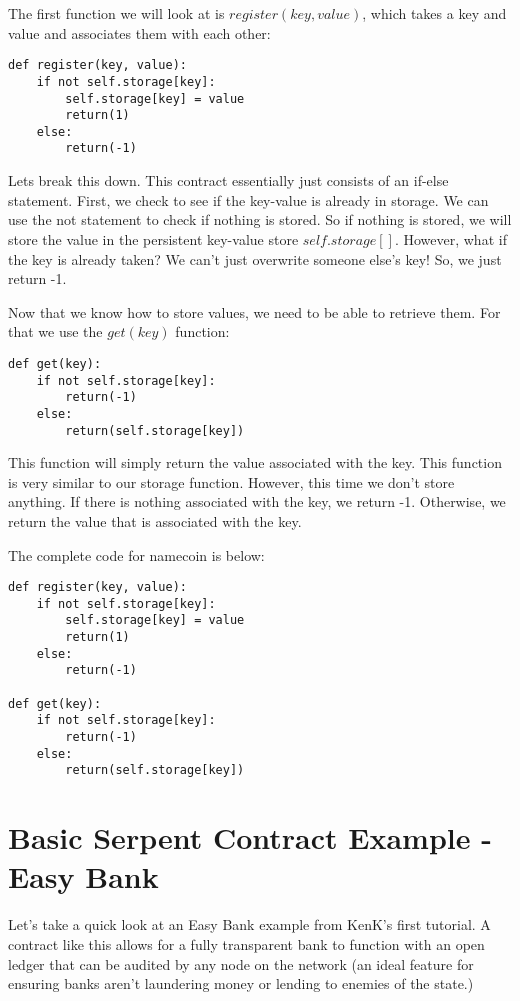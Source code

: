\documentclass[12pt]{article}
\begin{document}
The first function we will look at is $register(key, value)$, which takes a key and value and associates them with each other:

\begin{verbatim}
def register(key, value):
	if not self.storage[key]:
		self.storage[key] = value
		return(1)
	else:
		return(-1)
\end{verbatim}

Lets break this down. This contract essentially just consists of an if-else statement. First, we check to see if the key-value is already in storage. We can use the not statement to check if nothing is stored. So if nothing is stored, we will store the value in the persistent key-value store $self.storage[]$. However, what if the key is already taken? We can't just overwrite someone else's key! So, we just return -1. 

Now that we know how to store values, we need to be able to retrieve them. For that we use the $get(key)$ function:

\begin{verbatim}
def get(key):
	if not self.storage[key]:
		return(-1)
	else:
		return(self.storage[key])
\end{verbatim}

This function will simply return the value associated with the key. This function is very similar to our storage function. However, this time we don't store anything. If there is nothing associated with the key, we return -1. Otherwise, we return the value that is associated with the key.

The complete code for namecoin is below:

\begin{mdframed}
\begin{verbatim}
def register(key, value):
	if not self.storage[key]:
		self.storage[key] = value
		return(1)
	else:
		return(-1)

def get(key):
	if not self.storage[key]:
		return(-1)
	else:
		return(self.storage[key])
\end{verbatim}
\end{mdframed}

\section{Basic Serpent Contract Example - Easy Bank}
Let's take a quick look at an Easy Bank example from KenK's first tutorial. A contract like this allows for a fully transparent bank to function with an open ledger that can be audited by any node on the network (an ideal feature for ensuring banks aren't laundering money or lending to enemies of the state.)
\end{document}

